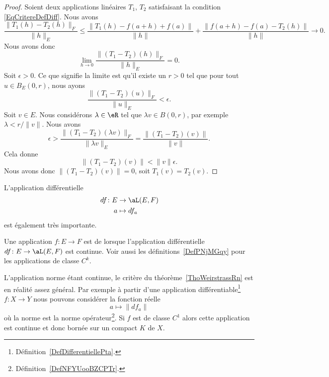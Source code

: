 \begin{proof}
    Soient deux applications linéaires \( T_1\), \( T_2\) satisfaisant la condition \eqref{EqCritereDefDiff}. Nous avons
    \begin{equation}
        \frac{ \| T_1(h)-T_2(h) \|_F }{ \| h \|_E }\leq \frac{ \| T_1(h)-f(a+h)+f(a) \| }{ \| h \| }+\frac{ \| f(a+h)-f(a)-T_2(h) \| }{ \| h \| }\to 0.
    \end{equation}
    Nous avons donc
    \begin{equation}
        \lim_{h\to 0} \frac{ \| (T_1-T_2)(h) \|_F }{ \| h \|_E }=0.
    \end{equation}
    Soit \( \epsilon>0\). Ce que signifie la limite est qu'il existe un \( r>0\) tel que pour tout \( u\in B_E(0,r)\), nous ayons
    \begin{equation}
        \frac{ \| (T_1-T_2)(u) \|_F }{ \| u \|_E }<\epsilon.
    \end{equation}
    Soit \( v\in E\). Nous considérons \( \lambda\in\eR\) tel que \( \lambda v\in B(0,r)\), par exemple \( \lambda<r/\| v \|\). Nous avons
    \begin{equation}
        \epsilon>\frac{ \| (T_1-T_2)(\lambda v) \|_F }{ \| \lambda v \|_E }=\frac{ \| (T_1-T_2)(v) \| }{ \| v \| }.
    \end{equation}
    Cela donne
    \begin{equation}
        \| (T_1-T_2)(v) \|<\| v \|\epsilon.
    \end{equation}
    Nous avons donc \( \| (T_1-T_2)(v) \|=0\), soit \( T_1(v)=T_2(v)\).
\end{proof}


L'application différentielle
\begin{equation}
    \begin{aligned}
        df\colon E&\to \aL(E,F) \\
        a&\mapsto df_a
    \end{aligned}
\end{equation}
est également très importante.

\begin{definition}      \label{DefJYBZooPTsfZx}
Une application \( f\colon E\to F\) est de  lorsque l'application différentielle \( df\colon E\to \aL(E,F)\) est continue. Voir aussi les définitions~\ref{DefPNjMGqy} pour les applications de classe \( C^k\).
\end{definition}

\begin{remark}      \label{RemATQVooDnZBbs}
    L'application norme étant continue, le critère du théorème~\ref{ThoWeirstrassRn} est en réalité assez général. Par exemple à partir d'une application différentiable\footnote{Définition~\ref{DefDifferentiellePta}.} \( f\colon X\to Y\)  nous pouvons considérer la fonction réelle
    \begin{equation}
        a\mapsto \|  df_a   \|
    \end{equation}
    où la norme est la norme opérateur\footnote{Définition~\ref{DefNFYUooBZCPTr}.}. Si \( f\) est de classe \( C^1\) alors cette application est continue et donc bornée sur un compact \( K\) de \( X\).
\end{remark}

